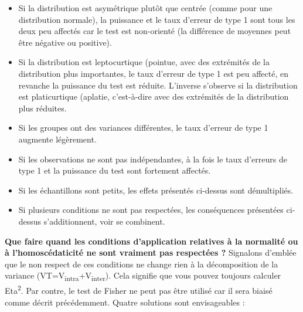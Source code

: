 \documentclass[
  11pt,
  french,
]{book}
\providecommand{\tightlist}{%
  \setlength{\itemsep}{0pt}\setlength{\parskip}{0pt}}
\begin{document}
\begin{itemize}
\tightlist
\item
  Si la distribution est asymétrique plutôt que centrée (comme pour une distribution normale), la puissance et le taux d'erreur de type 1 sont tous les deux peu affectés car le test est non-orienté (la différence de moyennes peut être négative ou positive).
\item
  Si la distribution est leptocurtique (pointue, avec des extrémités de la distribution plus importantes, le taux d'erreur de type 1 est peu affecté, en revanche la puissance du test est réduite. L'inverse s'observe si la distribution est platicurtique (aplatie, c'est-à-dire avec des extrémités de la distribution plus réduites.
\item
  Si les groupes ont des variances différentes, le taux d'erreur de type 1 augmente légèrement.
\item
  Si les observations ne sont pas indépendantes, à la fois le taux d'erreurs de type 1 et la puissance du test sont fortement affectés.
\item
  Si les échantillons sont petits, les effets présentés ci-dessus sont démultipliés.
\item
  Si plusieurs conditions ne sont pas respectées, les conséquences présentées ci-dessus s'additionnent, voir se combinent.
\end{itemize}

\textbf{Que faire quand les conditions d'application relatives à la normalité ou à l'homoscédaticité ne sont vraiment pas respectées ?} Signalons d'emblée que le non respect de ces conditions ne change rien à la décomposition de la variance (VT=V\textsubscript{intra}+V\textsubscript{inter}). Cela signifie que vous pouvez toujours calculer Eta\textsuperscript{2}. Par contre, le test de Fisher ne peut pas être utilisé car il sera biaisé comme décrit précédemment. Quatre solutions sont envisageables :
\end{document}
